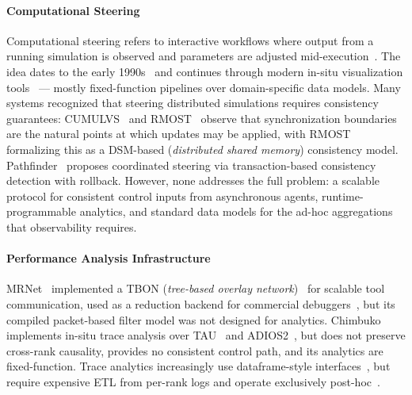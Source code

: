 \paragraph{Computational Steering}
Computational steering refers to interactive workflows where output from a running simulation
is observed and parameters are adjusted
mid-execution~\cite{Geist1997:Cumulvs}.
The idea dates to the early
1990s~\cite{Mille1998:SCIRun,Geist1997:Cumulvs} and continues through modern in-situ visualization
tools~\cite{Ayach2015:Catalyst,Larse2022:Ascent} --- mostly fixed-function pipelines over
domain-specific data models.
Many systems recognized that steering distributed simulations
requires consistency guarantees: CUMULVS~\cite{Geist1997:Cumulvs} and RMOST~\cite{Loren2008:RMOST}
observe that synchronization boundaries are
the natural points at which updates may be applied, with RMOST formalizing this as a
DSM-based (\emph{distributed shared memory})
consistency model.
Pathfinder~\cite{Hart1999:Pathfinder} proposes coordinated steering via
transaction-based consistency detection with rollback.
However, none
addresses the full problem: a scalable protocol for consistent control inputs from asynchronous
agents, runtime-programmable analytics, and standard data models for the ad-hoc aggregations that
observability
requires.

\paragraph{Performance Analysis Infrastructure}
MRNet~\cite{Roth2003:MRNet} implemented a TBON (\emph{tree-based overlay
  network})~\cite{Arnol2006:TBONs} for scalable tool communication, used as a reduction
backend for commercial debuggers~\cite{:TotalView}, but its compiled packet-based filter model
was not designed for analytics.
Chimbuko~\cite{Kelly2020:Chimbuko} implements in-situ trace analysis over TAU~\cite{Shend2006:TAU}
and ADIOS2~\cite{Godoy2020:ADIOS2}, but does not preserve cross-rank
causality, provides no consistent control path, and its analytics are
fixed-function.
Trace analytics increasingly use dataframe-style
interfaces~\cite{Boehm2016:Caliper,Bhate2019:Hatchet,Bhate2024:Pipit,Devar2024:DFTracer},
but require expensive ETL from per-rank logs and operate exclusively
post-hoc~\cite{Yildi2023:IOMax,Jain2025:AMR}.

